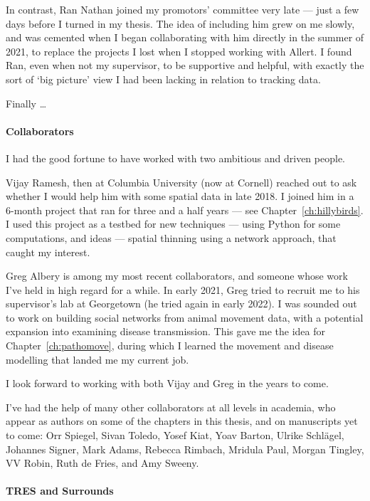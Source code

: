 In contrast, Ran Nathan joined my promotors' committee very late --- just a few days before I turned in my thesis.
The idea of including him grew on me slowly, and was cemented when I began collaborating with him directly in the summer of 2021, to replace the projects I lost when I stopped working with Allert.
I found Ran, even when not my supervisor, to be supportive and helpful, with exactly the sort of `big picture' view I had been lacking in relation to tracking data.

Finally \ldots

\paragraph*{Collaborators}

I had the good fortune to have worked with two ambitious and driven people.

Vijay Ramesh, then at Columbia University (now at Cornell) reached out to ask whether I would help him with some spatial data in late 2018.
I joined him in a 6-month project that ran for three and a half years --- see Chapter~\ref{ch:hillybirds}.
I used this project as a testbed for new techniques --- using Python for some computations, and ideas --- spatial thinning using a network approach, that caught my interest.

Greg Albery is among my most recent collaborators, and someone whose work I've held in high regard for a while.
In early 2021, Greg tried to recruit me to his supervisor's lab at Georgetown (he tried again in early 2022).
I was sounded out to work on building social networks from animal movement data, with a potential expansion into examining disease transmission.
This gave me the idea for Chapter~\ref{ch:pathomove}, during which I learned the movement and disease modelling that landed me my current job.

I look forward to working with both Vijay and Greg in the years to come.

I've had the help of many other collaborators at all levels in academia, who appear as authors on some of the chapters in this thesis, and on manuscripts yet to come: Orr Spiegel, Sivan Toledo, Yosef Kiat, Yoav Barton, Ulrike Schl{\"a}gel, Johannes Signer, Mark Adams, Rebecca Rimbach, Mridula Paul, Morgan Tingley, VV Robin, Ruth de Fries, and Amy Sweeny.

\paragraph*{TRES and Surrounds}

